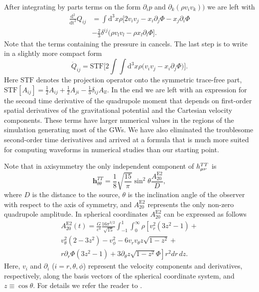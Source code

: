 After integrating by parts terms on the form $\partial_i p$ and $\partial_k (\rho v_i v_k))$
we are left with
\begin{align} \label{eqT:quaddtt3}
\frac{\mathrm{d}^2}{\mathrm{dt}^2} Q_{ij} & = \int \mathrm{d}^3 x \rho \bigg[ 2 v_i v_j  - x_i \partial_j \Phi -  x_j \partial_i \Phi \nonumber \\
&- \frac{2}{3} \delta^{ij} (\rho v_l v_l - \rho x_l \partial_l \Phi  \bigg]. 
\end{align}
Note that the terms containing the pressure in  cancels. The last step is to write  in a slightly more 
compact form    
\begin{equation} \label{eq:STFQ}
\ddot{Q}_{ij} =\mathrm{STF} \bigg[2 \int \int \mathrm{d}^3 x \rho \Big( v_i v_j - x_i \partial_j \Phi \Big) \bigg].
\end{equation}
Here $\mathrm{STF}$ denotes the projection operator
onto the symmetric trace-free part, $\mathrm{STF}[A_{ij}] = \frac{1}{2}A_{ij} + \frac{1}{2}A_{ji} - \frac{1}{3} \delta_{ij} A_{ll} $.
In the end we are left with an expression for the second time derivative of the quadrupole moment that
depends on first-order spatial derivatives of the gravitational potential and the Cartesian velocity components.
These terms have larger numerical values in the regions of the simulation generating most of the GWs. We have also 
eliminated the troublesome second-order time derivatives and arrived at a formula that is much more suited for 
computing waveforms in numerical studies than our starting point.

Note that in axisymmetry the only independent component of $h_{\mu\nu}^{TT}$ is 
\begin{equation}
\mathbf{h}^{TT}_{\theta \theta} = \frac{1}{8}\sqrt{\frac{15}{\pi}} \sin^2{\theta} \frac{A_{20}^\mathrm{E2}}{D},
\end{equation}
where $D$ is the distance to the source, $\theta$ is the inclination angle of the observer with respect to the
axis of symmetry, and $A_{20}^\mathrm{E2}$ represents the only non-zero quadrupole amplitude.
In spherical coordinates $A_{20}^\mathrm{E2}$ can be expressed as follows
\begin{eqnarray} \label{eq:2dquad}
A_{20}^\mathrm{E2} (t) =  \frac{G}{c^4} \frac{16 \pi^{3/2}}{\sqrt{15}} \int_{-1}^{1}\int^{\infty}_0 \rho \left [ v_r^2(3 z^2 - 1)+ \right. \nonumber \\
v_{\theta}^2(2-3 z^2) - v_{\phi}^2 - 6 v_r v_{\theta} z\sqrt{1-z^2} + \nonumber \\
r \partial_r \Phi (3 z^2 - 1) +\left. 3 \partial_{\theta}z\sqrt{1-z^2} \Phi \right ]r^2 dr \, dz.
\end{eqnarray}
Here, $v_i$ and $\partial_i$ ($i = r, \theta, \phi$) represent the velocity components and derivatives, respectively, along
the basis vectors of the spherical coordinate system, and $z \equiv \cos \theta$.
For details we refer the reader to \cite{mueller_97}.

